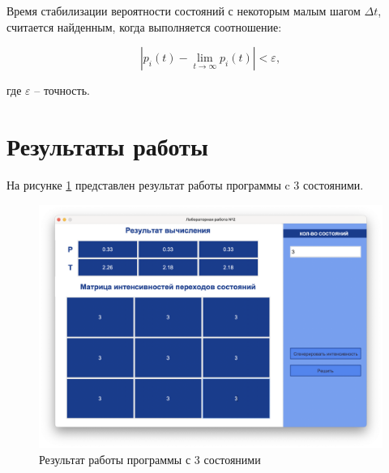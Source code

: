 Время стабилизации вероятности состояний с некоторым малым шагом $\Delta t$, считается найденным, когда выполняется соотношение:

\begin{equation}
	|p_i(t) -  \lim_{t \rightarrow \infty} p_i(t)| < \varepsilon,
\end{equation}

где $\varepsilon$ -- точность.

\section{Результаты работы}

На рисунке \ref{fig:r2} представлен результат работы программы c 3 состояними.

\begin{figure}[ht!]
	\includegraphics[width=0.75\linewidth]{assets/images/3_new.png}
	\caption{Результат работы программы с 3 состояними}
	\label{fig:r2}
\end{figure}